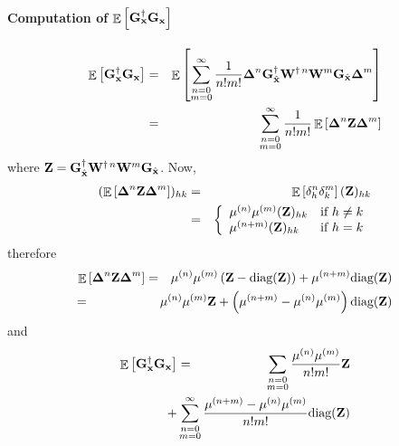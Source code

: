\documentclass[final, a4paper]{IEEEtran}
\newcommand{\xv}{{\bf x}}
\newcommand{\Gm}{{\bf G}}
\newcommand{\Wm}{{\bf W}}
\newcommand{\Zm}{{\bf Z}}
\def\xvh{{\hat{\xv}}}
\newcommand{\Deltam}{\hbox{\boldmath$\Delta$}}
\newcommand{\diag}{{\hbox{diag}}}
\def\non{\nonumber\\}
\begin{document}
\paragraph{Computation of $\EE\left[\Gm_\xv\Herm\Gm_\xv\right]$}
\begin{eqnarray*}
\EE\left[\Gm_\xv\Herm\Gm_\xv\right]
&=&\EE\left[\sum_{\substack{n=0 \\ m=0}}^\infty \frac{1}{n!m!}\Deltam^n\Gm_\xvh\Herm\Wm^{\dagger\,n}\Wm^m\Gm_\xvh\Deltam^m\right] \non
&=&\sum_{\substack{n=0 \\ m=0}}^\infty \frac{1}{n!m!}\EE\left[\Deltam^n\Zm\Deltam^m\right]
\end{eqnarray*}
where $\Zm = \Gm_\xvh\Herm\Wm^{\dagger\,n}\Wm^m\Gm_\xvh$.
Now,
\begin{eqnarray*}
(\EE\left[\Deltam^n\Zm\Deltam^m\right])_{hk} 
&=& \EE\left[\delta_h^n\delta_k^m\right](\Zm)_{hk} \non
&=& \left\{
\begin{array}{ll}
\mu^{(n)}\mu^{(m)}(\Zm)_{hk} & \mbox{if $h\neq k$} \\
\mu^{(n+m)}(\Zm)_{hk} & \mbox{if $h=k$} \\
\end{array}\right.
\end{eqnarray*}
therefore
\begin{eqnarray*}
\EE\left[\Deltam^n\Zm\Deltam^m\right]
&=&\mu^{(n)}\mu^{(m)}\left(\Zm-\diag(\Zm)\right) +\mu^{(n+m)}\diag(\Zm) \non
&\hspace{-20mm}=&\hspace{-10mm}\mu^{(n)}\mu^{(m)}\Zm + \left(\mu^{(n+m)}-\mu^{(n)}\mu^{(m)}\right)\diag(\Zm)
\end{eqnarray*}
and
\begin{eqnarray}
\EE\left[\Gm_\xv\Herm\Gm_\xv\right] 
&=& \sum_{\substack{n=0 \\ m=0}} \frac{\mu^{(n)}\mu^{(m)}}{n!m!} \Zm \non
&& \hspace{-10mm}+\sum_{\substack{n=0 \\ m=0}}^\infty \frac{\mu^{(n+m)}-\mu^{(n)}\mu^{(m)}}{n!m!}\diag(\Zm)
\label{eq:EFSF}
\end{eqnarray}
\end{document}
